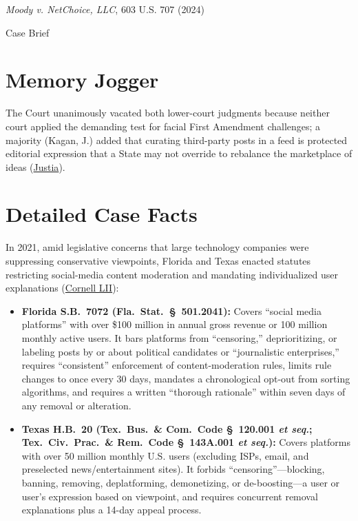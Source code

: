 \documentclass[12pt]{article}
\begin{document}
\begin{center}
{\LARGE \textit{Moody v. NetChoice, LLC}, 603 U.S. 707 (2024)\par}
\vspace{0.8em}
{\large Case Brief\par}
\end{center}
\vspace{1em}

\section{Memory Jogger}
The Court unanimously vacated both lower-court judgments because neither court applied the demanding test for facial First Amendment challenges; a majority (Kagan, J.) added that curating third-party posts in a feed is protected editorial expression that a State may not override to rebalance the marketplace of ideas (\href{https://supreme.justia.com/cases/federal/us/603/22-277/}{Justia}).

\section{Detailed Case Facts}
In 2021, amid legislative concerns that large technology companies were suppressing conservative viewpoints, Florida and Texas enacted statutes restricting social-media content moderation and mandating individualized user explanations (\href{https://www.law.cornell.edu/supremecourt/text/22-277}{Cornell LII}):
\begin{itemize}
    \item \textbf{Florida S.B.~7072 (Fla.\ Stat.~\S~501.2041):} Covers ``social media platforms'' with over \$100 million in annual gross revenue or 100 million monthly active users. It bars platforms from ``censoring,'' deprioritizing, or labeling posts by or about political candidates or ``journalistic enterprises,'' requires ``consistent'' enforcement of content-moderation rules, limits rule changes to once every 30 days, mandates a chronological opt-out from sorting algorithms, and requires a written ``thorough rationale'' within seven days of any removal or alteration.
    \item \textbf{Texas H.B.~20 (Tex.\ Bus.\ \& Com.\ Code \S~120.001 \textit{et seq.}; Tex.\ Civ.\ Prac.\ \& Rem.\ Code \S~143A.001 \textit{et seq.}):} Covers platforms with over 50 million monthly U.S. users (excluding ISPs, email, and preselected news/entertainment sites). It forbids ``censoring''---blocking, banning, removing, deplatforming, demonetizing, or de-boosting---a user or user's expression based on viewpoint, and requires concurrent removal explanations plus a 14-day appeal process.
\end{itemize}
\end{document}
